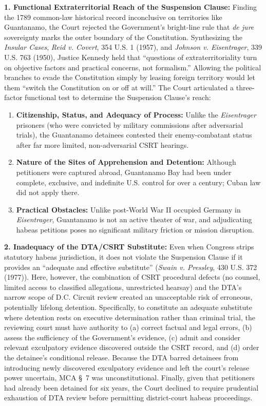 \documentclass[12pt]{article}
\begin{document}
\textbf{1. Functional Extraterritorial Reach of the Suspension Clause:} Finding the 1789 common-law historical record inconclusive on territories like Guantanamo, the Court rejected the Government's bright-line rule that \textit{de jure} sovereignty marks the outer boundary of the Constitution. Synthesizing the \textit{Insular Cases}, \textit{Reid v. Covert}, 354 U.S. 1 (1957), and \textit{Johnson v. Eisentrager}, 339 U.S. 763 (1950), Justice Kennedy held that ``questions of extraterritoriality turn on objective factors and practical concerns, not formalism.'' Allowing the political branches to evade the Constitution simply by leasing foreign territory would let them ``switch the Constitution on or off at will.'' The Court articulated a three-factor functional test to determine the Suspension Clause's reach:
\begin{enumerate}
  \item \textbf{Citizenship, Status, and Adequacy of Process:} Unlike the \textit{Eisentrager} prisoners (who were convicted by military commissions after adversarial trials), the Guantanamo detainees contested their enemy-combatant status after far more limited, non-adversarial CSRT hearings.
  \item \textbf{Nature of the Sites of Apprehension and Detention:} Although petitioners were captured abroad, Guantanamo Bay had been under complete, exclusive, and indefinite U.S. control for over a century; Cuban law did not apply there.
  \item \textbf{Practical Obstacles:} Unlike post-World War II occupied Germany in \textit{Eisentrager}, Guantanamo is not an active theater of war, and adjudicating habeas petitions poses no significant military friction or mission disruption.
\end{enumerate}

\textbf{2. Inadequacy of the DTA/CSRT Substitute:} Even when Congress strips statutory habeas jurisdiction, it does not violate the Suspension Clause if it provides an ``adequate and effective substitute'' (\textit{Swain v. Pressley}, 430 U.S. 372 (1977)). Here, however, the combination of CSRT procedural defects (no counsel, limited access to classified allegations, unrestricted hearsay) and the DTA's narrow scope of D.C. Circuit review created an unacceptable risk of erroneous, potentially lifelong detention. Specifically, to constitute an adequate substitute where detention rests on executive determination rather than criminal trial, the reviewing court must have authority to (a) correct factual and legal errors, (b) assess the sufficiency of the Government's evidence, (c) admit and consider relevant exculpatory evidence discovered outside the CSRT record, and (d) order the detainee's conditional release. Because the DTA barred detainees from introducing newly discovered exculpatory evidence and left the court's release power uncertain, MCA \S~7 was unconstitutional. Finally, given that petitioners had already been detained for six years, the Court declined to require prudential exhaustion of DTA review before permitting district-court habeas proceedings.
\end{document}
